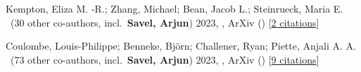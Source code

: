 \item[{\color{numcolor}\scriptsize2}] Kempton, Eliza M. -R.; Zhang, Michael; Bean, Jacob L.; Steinrueck, Maria E. \etal\ ({30} other co-authors, incl.\ \textbf{Savel, Arjun}) 2023, , ArXiv () [\href{https://ui.adsabs.harvard.edu/abs/2023arXiv230506240K}{2 citations}]

\item[{\color{numcolor}\scriptsize1}] Coulombe, Louis-Philippe; Benneke, Bj{\"o}rn; Challener, Ryan; Piette, Anjali A. A. \etal\ ({73} other co-authors, incl.\ \textbf{Savel, Arjun}) 2023, , ArXiv () [\href{https://ui.adsabs.harvard.edu/abs/2023arXiv230108192C}{9 citations}]